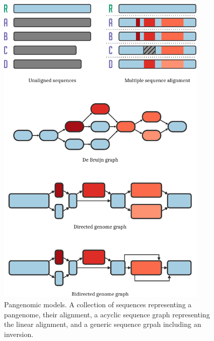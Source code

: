 \begin{figure}[p]
    \includegraphics[width=0.9\textwidth]{figures/data_structures.pdf}
    \caption{\label{fig:models} Pangenomic models.
      A collection of sequences representing a pangenome, their alignment, a acyclic sequence graph representing the linear alignment, and a generic sequence grpah including an inversion.
    }
\end{figure}
